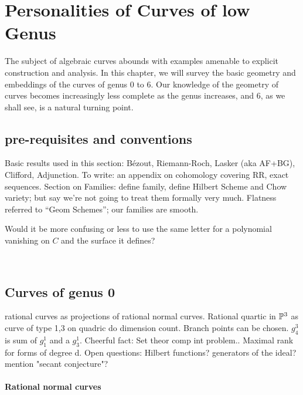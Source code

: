 

\chapter{Personalities of Curves of low Genus}\label{personalities chapter}

The subject of algebraic curves abounds with examples amenable to explicit construction and analysis. In this chapter, we will survey the basic geometry and embeddings of the curves of genus 0 to  6. Our knowledge of the geometry of curves becomes increasingly less complete as the genus increases, and 6, as we shall see, is a natural turning point. 
\section{pre-requisites and conventions}


Basic results used in this section: B\'ezout, Riemann-Roch, Lasker (aka AF+BG), Clifford, Adjunction.
To write: an appendix on cohomology covering RR, exact sequences.
Section on Families: define family, define Hilbert Scheme and Chow variety;  but say we're not going to treat them formally very much. Flatness referred to ``Geom Schemes''; our families are smooth.


Would it be more confusing or less to use the same letter for a polynomial vanishing on $C$ and the surface it defines?

\




\section{Curves of genus 0} 

rational curves as projections of rational normal curves. Rational quartic in $\PP^3$ as curve of type 1,3 on quadric do dimension count. Branch points can be chosen. $g^3_4$ is sum of $g^1_1$ and a $g^1_3$. Cheerful fact: Set theor comp int problem.. Maximal rank for forms of degree d. Open questions: Hilbert functions? generators of the ideal? mention "secant conjecture"?

\subsubsection{Rational normal curves}

